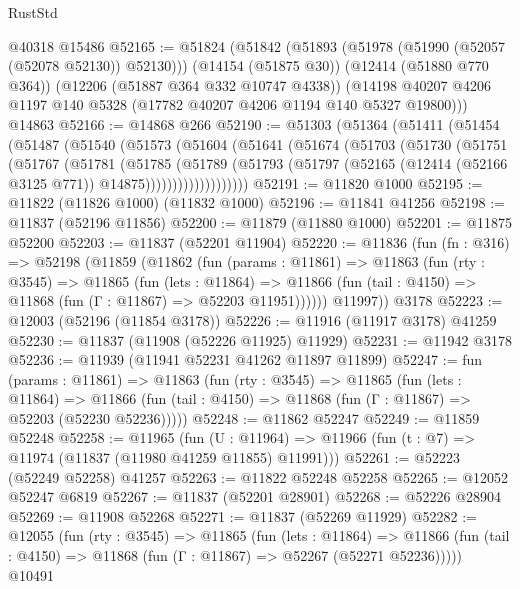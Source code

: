 \begin{lexlean}{RustStd}
\begin{coremodule}
{\begin{coremodule}
{{{{{{{{{{{{{{{{{{{{{{{{{{{{{{{{{{{{{{{{{{{{{{{{{{    @40318
    @15486
@52165 := @51824
    (@51842
      (@51893 (@51978 (@51990 (@52057 (@52078 @52130)) @52130)))
      (@14154 (@51875 @30))
      (@12414 (@51880 @770 @364))
      (@12206 (@51887 @364 @332 @10747 @4338))
      (@14198 @40207 @4206 @1197 @140 @5328 (@17782 @40207 @4206 @1194 @140 @5327 @19800)))
    @14863
@52166 := @14868 @266
@52190 := @51303
    (@51364
      (@51411
        (@51454
          (@51487
            (@51540
              (@51573
                (@51604
                  (@51641
                    (@51674
                      (@51703
                        (@51730
                          (@51751
                            (@51767
                              (@51781
                                (@51785
                                  (@51789
                                    (@51793
                                      (@51797
                                        (@52165
                                          (@12414 (@52166 @3125 @771))
                                          @14875)))))))))))))))))))
@52191 := @11820 @1000
@52195 := @11822 (@11826 @1000) (@11832 @1000)
@52196 := @11841 @41256
@52198 := @11837 (@52196 @11856)
@52200 := @11879 (@11880 @1000)
@52201 := @11875 @52200
@52203 := @11837 (@52201 @11904)
@52220 := @11836
    (fun (fn : @316) =>
    @52198
      (@11859
        (@11862
          (fun (params : @11861) =>
          @11863
            (fun (rty : @3545) =>
            @11865
              (fun (lets : @11864) =>
              @11866 (fun (tail : @4150) => @11868 (fun (Γ : @11867) => @52203 @11951))))))
        @11997))
    @3178
@52223 := @12003 (@52196 (@11854 @3178))
@52226 := @11916 (@11917 @3178) @41259
@52230 := @11837 (@11908 (@52226 @11925) @11929)
@52231 := @11942 @3178
@52236 := @11939 (@11941 @52231 @41262 @11897 @11899)
@52247 := fun (params : @11861) =>
  @11863
    (fun (rty : @3545) =>
    @11865
      (fun (lets : @11864) =>
      @11866 (fun (tail : @4150) => @11868 (fun (Γ : @11867) => @52203 (@52230 @52236)))))
@52248 := @11862 @52247
@52249 := @11859 @52248
@52258 := @11965
    (fun (U : @11964) => @11966 (fun (t : @7) => @11974 (@11837 (@11980 @41259 @11855) @11991)))
@52261 := @52223 (@52249 @52258) @41257
@52263 := @11822 @52248 @52258
@52265 := @12052 @52247 @6819
@52267 := @11837 (@52201 @28901)
@52268 := @52226 @28904
@52269 := @11908 @52268
@52271 := @11837 (@52269 @11929)
@52282 := @12055
    (fun (rty : @3545) =>
    @11865
      (fun (lets : @11864) =>
      @11866 (fun (tail : @4150) => @11868 (fun (Γ : @11867) => @52267 (@52271 @52236)))))
    @10491
}}}}}}}}}}}}}}}}}}}}}}}}}}}}}}}}}}}}}}}}}}}}}}}}}}
\end{coremodule}}
\end{coremodule}
\end{lexlean}
